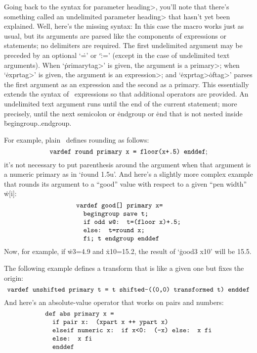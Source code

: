 Going back to the syntax for \<parameter heading>, you'll note that there's
something called an \<un\-delim\-ited parameter heading> that hasn't yet been
explained. Well, here's the missing syntax:
In this case the macro works just as usual, but its arguments are parsed
like the components of expressions or statements; no delimiters are required.
The first undelimited argument may be preceded by an optional
`\.=' or `\.{:=}' (except in the case of undelimited text arguments).
When `\.{primary}\<tag>' is given, the argument is a \<primary>; when
`\.{expr}\<tag>' is given, the argument is an \<expression>;
and `\.{expr}\<tag>\.{of}\<tag>' parses the first argument as an
expression and the second as a primary. This essentially extends the
syntax of \MF\ expressions so that additional operators are provided.
An undelimited text argument runs until the end of the current statement;
more precisely, until the next semicolon or
\.{endgroup} or \.{end} that is not nested inside \.{begingroup..endgroup}.

For example, plain \MF\ defines rounding as follows:
$$\hbox{\tt vardef round primary x = floor(x+.5) enddef};$$
it's not necessary to put parenthesis around the argument when that
argument is a numeric primary as in `\.{round 1.5u}'. And here's
a slightly more complex example that rounds its argument to a ``good''
value with respect to a given ``pen width'' \.{w[i]}:
$$\vcenter{\halign{\tt#\hfil\cr
vardef good[] primary x=\cr
\ \ begingroup save t;\cr
\ \ if odd w@: t=(floor x)+.5;\cr
\ \ else: t=round x;\cr
\ \ fi; t endgroup enddef\cr}}$$
Now, for example, if \.{w3=4.9} and \.{x10=15.2}, the result of
`\.{good3 x10}' will be 15.5.

The following example defines a transform that is like a given one but
fixes the origin:
$$\hbox{\tt vardef unshifted primary t =
  t shifted-((0,0) transformed t) enddef}$$
And here's an absolute-value operator that works on pairs and numbers:
$$\vcenter{\halign{\tt#\hfil\cr
def abs primary x =\cr
\ \ if pair x: (xpart x ++ ypart x)\cr
\ \ elseif numeric x: if x<0: (-x) else: x fi\cr
\ \ else: x fi\cr
\ \ enddef\cr}}$$

